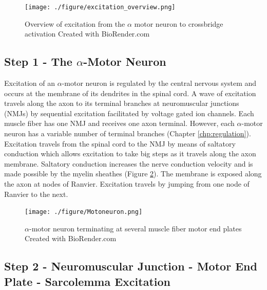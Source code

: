 \begin{figure}[!ht]
    \centering
    \texttt{[image: ./figure/excitation\_overview.png]}
    \caption{Overview of excitation from the $\alpha$ motor neuron to crossbridge activation \footnotesize{Created with BioRender.com}}
    \label{fig:excitation_overview}
\end{figure}

\subsection{Step 1 - The $\alpha$-Motor Neuron}
Excitation of an $\alpha$-motor neuron is regulated by the central nervous system and occurs at the membrane of its dendrites in the spinal cord. A wave of excitation travels along the axon to its terminal branches at neuromuscular junctions (NMJs) by sequential excitation facilitated by voltage gated ion channels. Each muscle fiber has one NMJ and receives one axon terminal. However, each $\alpha$-motor neuron has a variable number of terminal branches (Chapter \ref{chp:regulation}).  Excitation travels from the spinal cord to the NMJ by means of saltatory conduction which allows excitation to take big steps as it travels along the axon membrane. Saltatory conduction increases the nerve conduction velocity and is made possible by the myelin sheathes (Figure \ref{fig:Motoneuron}). The membrane is exposed along the axon at nodes of Ranvier. Excitation travels by jumping from one node of Ranvier to the next.\footnotemark{} 

\begin{figure}[!ht]
    \centering
    \texttt{[image: ./figure/Motoneuron.png]}
    \caption{$\alpha$-motor neuron terminating at several muscle fiber motor end plates \footnotesize{Created with BioRender.com}}
    \label{fig:Motoneuron}
\end{figure}

\subsection{Step 2 - Neuromuscular Junction - Motor End Plate - Sarcolemma Excitation}

